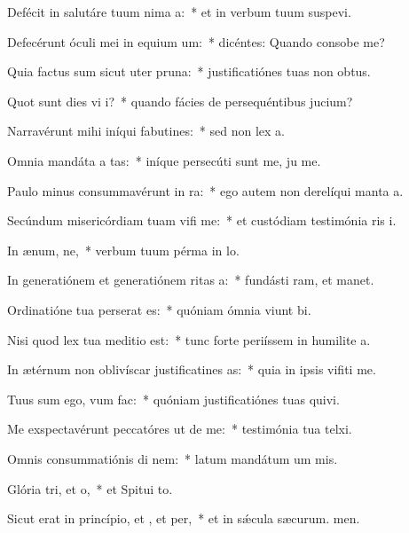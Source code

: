\item Defécit in salutáre tuum nima a:~* et in verbum tuum suspevi.
\item Defecérunt óculi mei in equium um:~* dicéntes: Quando consobe me?
\item Quia factus sum sicut uter  pruna:~* justificatiónes tuas non  obtus.
\item Quot sunt dies vi i?~* quando fácies de persequéntibus  jucium?
\item Narravérunt mihi iníqui fabutines:~* sed non  lex a.
\item Omnia mandáta a tas:~* iníque persecúti sunt me, ju me.
\item Paulo minus consummavérunt  in ra:~* ego autem non derelíqui manta a.
\item Secúndum misericórdiam tuam vifi me:~* et custódiam testimónia ris i.
\item In ænum, ne,~* verbum tuum pérma in lo.
\item In generatiónem et generatiónem ritas a:~* fundásti ram, et manet.
\item Ordinatióne tua perserat es:~* quóniam ómnia viunt bi.
\item Nisi quod lex tua meditio  est:~* tunc forte periíssem in humilite a.
\item In ætérnum non oblivíscar justificatines as:~* quia in ipsis vifiti me.
\item Tuus sum ego, vum  fac:~* quóniam justificatiónes tuas quivi.
\item Me exspectavérunt peccatóres ut de me:~* testimónia tua telxi.
\item Omnis consummatiónis di nem:~* latum mandátum um mis.
\item Glória tri, et o,~* et Spitui to.
\item Sicut erat in princípio, et , et per,~* et in sǽcula sæcurum. men.
